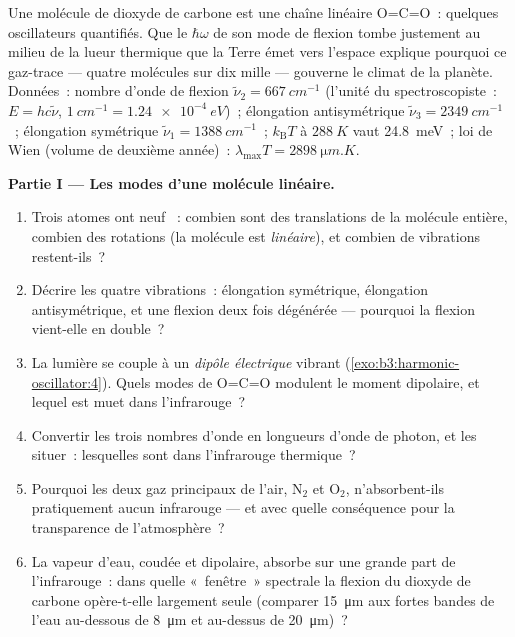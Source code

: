 \begin{problem}\label{pb:b3:harmonic-oscillator:1}
Une molécule de dioxyde de carbone est une chaîne linéaire O=C=O~:
quelques oscillateurs quantifiés. Que le $\hbar\omega$ de son mode de
flexion tombe justement au milieu de la lueur thermique que la Terre
émet vers l'espace explique pourquoi ce gaz-trace --- quatre molécules
sur dix mille --- gouverne le climat de la planète. Données~: nombre
d'onde de flexion $\tilde\nu_2 = \qty{667}{cm^{-1}}$ (l'unité du
spectroscopiste~: $E = hc\tilde\nu$, $\qty{1}{cm^{-1}} =
\qty{1.24e-4}{eV}$)~; élongation antisymétrique $\tilde\nu_3 =
\qty{2349}{cm^{-1}}$~; élongation symétrique $\tilde\nu_1 =
\qty{1388}{cm^{-1}}$~; $k_{\text{B}}T$ à $\qty{288}{K}$ vaut
\qty{24.8}{meV}~; loi de Wien (volume de deuxième année)~: $\lambda_{\max}T =
\qty{2898}{\micro m.K}$.

\medskip\noindent\textbf{Partie I --- Les modes d'une molécule linéaire.}
\begin{enumerate}
  \item Trois atomes ont neuf ~: combien sont des
        translations de la molécule entière, combien des rotations (la
        molécule est \emph{linéaire}), et combien de vibrations
        restent-ils~?
  \item Décrire les quatre vibrations~: élongation symétrique,
        élongation antisymétrique, et une flexion deux fois dégénérée
        --- pourquoi la flexion vient-elle en double~?
  \item La lumière se couple à un \emph{dipôle électrique} vibrant
        (\cref{exo:b3:harmonic-oscillator:4}). Quels modes de O=C=O
        modulent le moment dipolaire, et lequel est muet dans
        l'infrarouge~?
  \item Convertir les trois nombres d'onde en longueurs d'onde de
        photon, et les situer~: lesquelles sont dans l'infrarouge
        thermique~?
  \item Pourquoi les deux gaz principaux de l'air, N$_2$ et O$_2$,
        n'absorbent-ils pratiquement aucun infrarouge --- et avec
        quelle conséquence pour la transparence de l'atmosphère~?
  \item La vapeur d'eau, coudée et dipolaire, absorbe sur une grande
        part de l'infrarouge~: dans quelle «~fenêtre~» spectrale la
        flexion du dioxyde de carbone opère-t-elle largement seule
        (comparer \qty{15}{\micro m} aux fortes bandes de l'eau
        au-dessous de \qty{8}{\micro m} et au-dessus de
        \qty{20}{\micro m})~?
\end{enumerate}


\end{problem}
